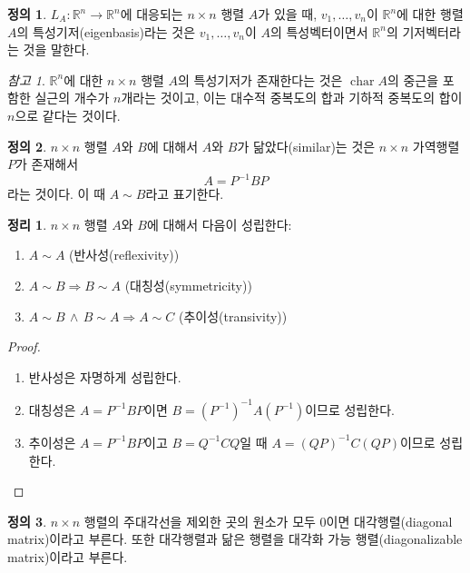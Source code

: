 \documentclass[unfonts,oneside,a4paper]{oblivoir}
\theoremstyle{definition}
\newtheorem{definition}{정의}[section]
\theoremstyle{theorem}
\newtheorem{theorem}{정리}[section]
\theoremstyle{theorem}
\theoremstyle{remark}
\newtheorem*{remark}{참고}
\theoremstyle{remark}
\theoremstyle{remark}
\theoremstyle{remark}
\renewcommand{\vec}[1]{\bm{\mathit{#1}}}
\DeclareMathOperator{\Char}{char}
\begin{document}
\begin{definition}
    $L_A: \mathbb R^n \rightarrow \mathbb R^n$에 대응되는 $n \times n$ 행렬 $A$가 있을 때, $\vec v_1, \dots, \vec v_n$이 $\mathbb R^n$에 대한 행렬 $A$의 특성기저(eigenbasis)라는 것은 $\vec v_1, \dots, \vec v_n$이 $A$의 특성벡터이면서 $\mathbb R^n$의 기저벡터라는 것을 말한다.
\end{definition}

\begin{remark}
    $\mathbb R^n$에 대한 $n \times n$ 행렬 $A$의 특성기저가 존재한다는 것은 $\Char A$의 중근을 포함한 실근의 개수가 $n$개라는 것이고, 이는 대수적 중복도의 합과 기하적 중복도의 합이 $n$으로 같다는 것이다.
\end{remark}

\begin{definition}
    $n \times n$ 행렬 $A$와 $B$에 대해서 $A$와 $B$가 닮았다(similar)는 것은 $n \times n$ 가역행렬 $P$가 존재해서
    \begin{equation*}
        A = P^{-1} B P
    \end{equation*}
    라는 것이다.
    이 때 $A \sim B$라고 표기한다.
\end{definition}

\begin{theorem}
    $n \times n$ 행렬 $A$와 $B$에 대해서 다음이 성립한다:
    \begin{enumerate}
        \item $A \sim A$ (반사성(reflexivity))
        \item $A \sim B \Rightarrow B \sim A$ (대칭성(symmetricity))
        \item $A \sim B \,\wedge\, B \sim A \Rightarrow A \sim C$ (추이성(transivity))
    \end{enumerate}
\end{theorem}

\begin{proof}
    \leavevmode
    \begin{enumerate}
        \item 반사성은 자명하게 성립한다.
        \item 대칭성은 $A = P^{-1} B P$이면 $B = (P^{-1})^{-1} A (P^{-1})$이므로 성립한다.
        \item 추이성은 $A = P^{-1}BP$이고 $B = Q^{-1} C Q$일 때 $A = (QP)^{-1} C (QP)$이므로 성립한다.
    \end{enumerate}
\end{proof}

\begin{definition}
    $n \times n$ 행렬의 주대각선을 제외한 곳의 원소가 모두 0이면 대각행렬(diagonal matrix)이라고 부른다.
    또한 대각행렬과 닮은 행렬을 대각화 가능 행렬(diagonalizable matrix)이라고 부른다.
\end{definition}
\end{document}
